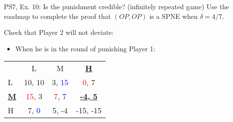 \begin{frame}{PS7, Ex. 10: Is the punishment credible? (infinitely repeated game)}
  Use the roadmap to complete the proof that $(OP,OP)$ is a SPNE when $\delta=4/7$.\vspace{-4pt}
  \begin{multicols}{2}
    Check that Player 2 will not deviate:
    \begin{itemize}
      \item[4.] When he is in the  round of punishing Player 1:
    \end{itemize}
    \vfill\null\columnbreak
    \vspace{-6pt}
    \begin{table}
      \begin{tabular}{l|c|c|c|}
        \multicolumn{1}{c}{} & \multicolumn{1}{c}{L} & \multicolumn{1}{c}{M} & \multicolumn{1}{c}{\textbf{\underline{H}}} \\\cline{2-4}
        L & 10, 10 & 3, \textcolor{blue}{15} & \textcolor{red}{0}, 7 \\\cline{2-4}
        \textbf{\underline{M}} & \textcolor{red}{15}, 3 & \textcolor{red}{7}, \textcolor{blue}{7} & \textbf{\underline{-4, 5}} \\\cline{2-4}
        H & 7, \textcolor{blue}{0} & 5, -4 & -15, -15 \\\cline{2-4}
      \end{tabular}
    \end{table}
    \vfill\null
  \end{multicols}
    \vfill\null
\end{frame}

